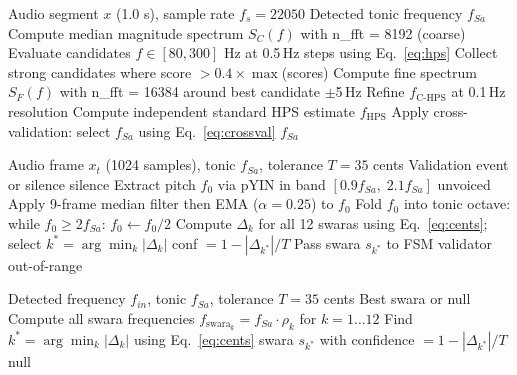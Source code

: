 \documentclass[12pt,a4paper]{report}
\numberwithin{equation}{chapter}
\begin{document}
\begin{algorithm}[htbp]
\caption{Tonic Sa Detection (Carnatic HPS Ensemble with Cross-Validation)}
\label{alg:tonic}
\begin{algorithmic}[1]
\Require Audio segment $x$ (1.0 s), sample rate $f_s = 22050$
\Ensure Detected tonic frequency $f_{Sa}$
\State Compute median magnitude spectrum $S_C(f)$ with n\_fft = 8192 (coarse)
\State Evaluate candidates $f \in [80, 300]$ Hz at 0.5\,Hz steps using Eq.~\ref{eq:hps}
\State Collect strong candidates where score $> 0.4 \times \max$(scores)
\State Compute fine spectrum $S_F(f)$ with n\_fft = 16384 around best candidate $\pm$5\,Hz
\State Refine $f_{\text{C-HPS}}$ at 0.1\,Hz resolution
\State Compute independent standard HPS estimate $f_{\text{HPS}}$
\State Apply cross-validation: select $f_{Sa}$ using Eq.~\ref{eq:crossval}
\State \Return $f_{Sa}$
\end{algorithmic}
\end{algorithm}

\begin{algorithm}[htbp]
\caption{Real-Time Frame Processing}
\label{alg:frame}
\begin{algorithmic}[1]
\Require Audio frame $x_t$ (1024 samples), tonic $f_{Sa}$, tolerance $T = 35$ cents
\Ensure Validation event or silence
 \State \Return silence \EndIf
\State Extract pitch $f_0$ via pYIN in band $[0.9 f_{Sa},\; 2.1 f_{Sa}]$
 \State \Return unvoiced \EndIf
\State Apply 9-frame median filter then EMA ($\alpha = 0.25$) to $f_0$
\State Fold $f_0$ into tonic octave: while $f_0 \geq 2 f_{Sa}$: $f_0 \leftarrow f_0 / 2$
\State Compute $\Delta_k$ for all 12 swaras using Eq.~\ref{eq:cents}; select $k^* = \arg\min_k |\Delta_k|$
    \State conf $= 1 - |\Delta_{k^*}| / T$
    \State Pass swara $s_{k^*}$ to FSM validator
\Else \State \Return out-of-range \EndIf
\end{algorithmic}
\end{algorithm}

\begin{algorithm}[htbp]
\caption{Swara Quantization with Tonic Ratios}
\label{alg:swara}
\begin{algorithmic}[1]
\Require Detected frequency $f_{in}$, tonic $f_{Sa}$, tolerance $T = 35$ cents
\Ensure Best swara or null
\State Compute all swara frequencies $f_{\text{swara}_k} = f_{Sa} \cdot \rho_k$ for $k = 1 \ldots 12$
\State Find $k^* = \arg\min_k |\Delta_k|$ using Eq.~\ref{eq:cents}
    \State \Return swara $s_{k^*}$ with confidence $= 1 - |\Delta_{k^*}| / T$
\Else
    \State \Return null
\EndIf
\end{algorithmic}
\end{algorithm}
\end{document}
